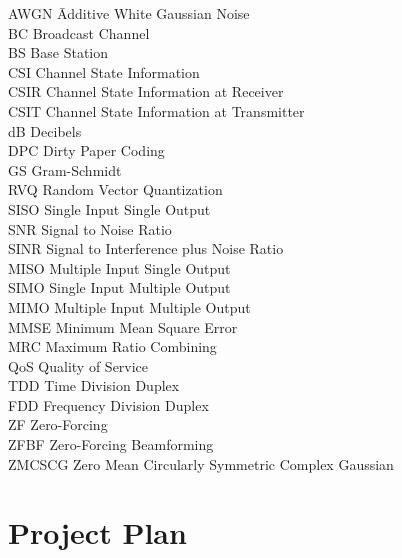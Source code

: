 \documentclass[a4paper,twoside,phd]{BYUPhys}
\begin{document}
\begin{tabbing}

AWGN \qquad \qquad \= Additive White Gaussian Noise\\
BC \> Broadcast Channel\\
BS \> Base Station\\
CSI \> Channel State Information\\
CSIR \> Channel State Information at Receiver\\
CSIT \> Channel State Information at Transmitter\\
dB \> Decibels\\
DPC \> Dirty Paper Coding\\
GS \> Gram-Schmidt\\
RVQ \> Random Vector Quantization\\
SISO \> Single Input Single Output\\
SNR \> Signal to Noise Ratio\\
SINR \> Signal to Interference plus Noise Ratio\\
MISO \> Multiple Input Single Output\\
SIMO \> Single Input Multiple Output\\
MIMO \> Multiple Input Multiple Output\\
MMSE \> Minimum Mean Square Error\\
MRC \> Maximum Ratio Combining\\ 
QoS \> Quality of Service\\
TDD \> Time Division Duplex\\
FDD \> Frequency Division Duplex\\
ZF \> Zero-Forcing\\
ZFBF \> Zero-Forcing Beamforming\\
ZMCSCG \> Zero Mean Circularly Symmetric Complex Gaussian\\

\end{tabbing}


\appendix
\chapter{Project Plan}
\end{document}
